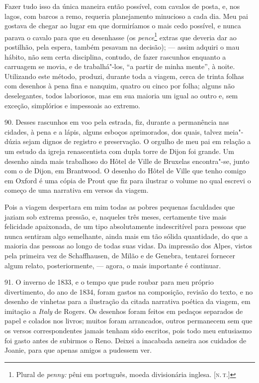 Fazer tudo isso da única maneira então possível, com cavalos de posta,
e, nos lagos, com barcos a remo, requeria planejamento minucioso a cada
dia. Meu pai gostava de chegar ao lugar em que dormiríamos o mais cedo
possível, e nunca parava o cavalo para que eu desenhasse (os
\emph{pence}\footnote{Plural de \emph{penny:} pêni em português, moeda
  divisionária inglesa. {[}\textsc{n.\,t.}{]}} extras que deveria dar ao
postilhão, pela espera, também pesavam na decisão); --- assim adquiri o
mau hábito, não sem certa disciplina, contudo, de fazer rascunhos
enquanto a carruagem se movia, e de trabalhá"-los, ``a partir de minha
mente'', à noite. Utilizando este método, produzi, durante toda a
viagem, cerca de trinta folhas com desenhos à pena fina e nanquim,
quatro ou cinco por folha; alguns não deselegantes, todos laboriosos,
mas em sua maioria um igual ao outro e, sem exceção, simplórios e
impessoais ao extremo.

90. Desses rascunhos em voo pela estrada, fiz, durante a permanência nas
cidades, à pena e a lápis, alguns esboços aprimorados, dos quais, talvez
meia"-dúzia sejam dignos de registro e preservação. O orgulho de meu pai
em relação a um estudo da igreja renascentista com dupla torre de Dijon
foi grande. Um desenho ainda mais trabalhoso do Hôtel de Ville de
Bruxelas encontra"-se, junto com o de Dijon, em Brantwood. O desenho do
Hôtel de Ville que tenho comigo em Oxford é uma cópia de Prout que fiz
para ilustrar o volume no qual escrevi o começo de uma narrativa em
versos da viagem.

Pois a viagem despertara em mim todas as pobres pequenas faculdades que
jaziam sob extrema pressão, e, naqueles três meses, certamente tive mais
felicidade apaixonada, de um tipo absolutamente indescritível para
pessoas que nunca sentiram algo semelhante, ainda mais em tão sólida
quantidade, do que a maioria das pessoas ao longo de todas suas vidas.
Da impressão dos Alpes, vistos pela primeira vez de Schaffhausen, de
Milão e de Genebra, tentarei fornecer algum relato, posteriormente, ---
agora, o mais importante é continuar.

91. O inverno de 1833, e o tempo que pude roubar para meu próprio
divertimento, do ano de 1834, foram gastos na composição, revisão do
texto, e no desenho de vinhetas para a ilustração da citada narrativa
poética da viagem, em imitação a \emph{Italy} de Rogers. Os desenhos
foram feitos em pedaços separados de papel e colados nos livros; muitos
foram arrancados, outros permanecem sem que os versos correspondentes
jamais tenham sido escritos, pois todo meu entusiasmo foi gasto antes de
subirmos o Reno. Deixei a inacabada asneira aos cuidados de Joanie, para
que apenas amigos a pudessem ver.

